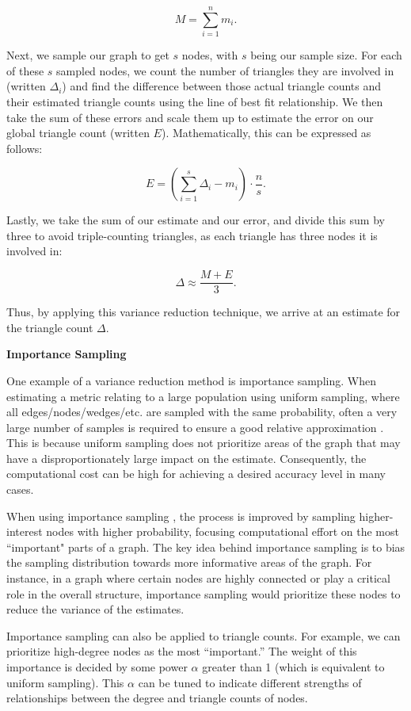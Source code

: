 \documentclass[11pt]{article}
\newcommand{\subsubsubsection}[1]{
  \vspace{1em} %
  \noindent\textbf{#1} %
  \vspace{0.5em} %
}
\begin{document}
\[
M = \sum_{i = 1}^{n} m_i.
\]

Next, we sample our graph to get $s$ nodes, with $s$ being our sample size. For each of these $s$ sampled nodes, we count the number of triangles they are involved in (written $\Delta_i$) and find the difference between those actual triangle counts and their estimated triangle counts using the line of best fit relationship. We then take the sum of these errors and scale them up to estimate the error on our global triangle count (written $E$). Mathematically, this can be expressed as follows:

\[
E = \left( \sum_{i = 1}^{s} \Delta_i - m_i \right) \cdot \frac{n}{s}.
\]

Lastly, we take the sum of our estimate and our error, and divide this sum by three to avoid triple-counting triangles, as each triangle has three nodes it is involved in:

\[
\Delta \approx \frac{M + E}{3}.
\]

Thus, by applying this variance reduction technique, we arrive at an estimate for the triangle count $\Delta$.

\subsubsubsection{Importance Sampling}

One example of a variance reduction method is importance sampling.
When estimating a metric relating to a large population using uniform sampling, where all edges/nodes/wedges/etc. are sampled with the same probability, often a very large number of samples is required to ensure a good relative approximation \cite{lovasz_large_2012}.
This is because uniform sampling does not prioritize areas of the graph that may have a disproportionately large impact on the estimate.
Consequently, the computational cost can be high for achieving a desired accuracy level in many cases.

When using importance sampling \cite{motwani_randomized_1995}, the process is improved by sampling higher-interest nodes with higher probability, focusing computational effort on the most ``important" parts of a graph.
The key idea behind importance sampling is to bias the sampling distribution towards more informative areas of the graph.
For instance, in a graph where certain nodes are highly connected or play a critical role in the overall structure, importance sampling would prioritize these nodes to reduce the variance of the estimates.

Importance sampling can also be applied to triangle counts.
For example, we can prioritize high-degree nodes as the most ``important.''
The weight of this importance is decided by some power $\alpha$ greater than 1 (which is equivalent to uniform sampling).
This $\alpha$ can be tuned to indicate different strengths of relationships between the degree and triangle counts of nodes. 
\end{document}
